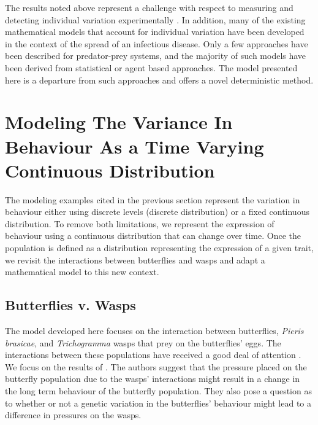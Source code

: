 \documentclass[review,authoryear]{elsarticle}
\begin{document}
The results noted above represent a challenge with respect to measuring and detecting individual variation experimentally \citep{doi:10.1037/0735-7036.107.3.250}. In addition, 
many of the existing mathematical models that account for individual variation have been
developed in the context of the spread of an infectious disease. Only
a few approaches have been described for predator-prey systems, and
the majority of such models have been derived from statistical or
agent based approaches. The model presented here is a departure from
such approaches and offers a novel deterministic method.


\section{Modeling The Variance In Behaviour As a Time Varying Continuous Distribution}

The modeling examples cited in the previous section represent the variation in behaviour either using discrete levels (discrete distribution) or a fixed continuous distribution. To remove both limitations, we represent the expression of behaviour using a continuous distribution that can change over time. Once the population is defined as a distribution
representing the expression of a given trait, we revisit the interactions between
butterflies and wasps and adapt a mathematical model to this new context.


\subsection{Butterflies v. Wasps}
\label{butterflyVWasps}

The model developed here focuses on the interaction between butterflies,
\textit{Pieris brasicae}, and \textit{Trichogramma} wasps that prey on
the butterflies' eggs. The interactions between these populations have
received a good deal of attention
\citep{PMC2797620,doi:10.1111/j.1439-0418.1986.tb00834.x,Figueroa2010AttractionOT,10.3389/fpls.2019.01768}. We
focus on the results of \cite{10.1093/beheco/arq007}. The authors suggest that 
 the pressure placed on the butterfly population due to the wasps'
interactions might result in a change in the long term behaviour of the
butterfly population. They also pose a question as to whether or not a genetic variation in the butterflies' behaviour might lead to a difference in pressures on the wasps.
\end{document}
